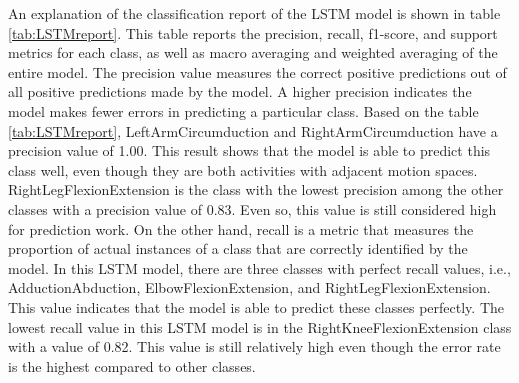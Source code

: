 An explanation of the classification report of the LSTM model is shown in table \ref{tab:LSTMreport}. This table reports the precision, recall, f1-score, and support metrics for each class, as well as macro averaging and weighted averaging of the entire model. The precision value measures the correct positive predictions out of all positive predictions made by the model. A higher precision indicates the model makes fewer errors in predicting a particular class. Based on the table \ref{tab:LSTMreport}, LeftArmCircumduction and RightArmCircumduction have a precision value of 1.00. This result shows that the model is able to predict this class well, even though they are both activities with adjacent motion spaces. RightLegFlexionExtension is the class with the lowest precision among the other classes with a precision value of 0.83. Even so, this value is still considered high for prediction work. On the other hand, recall is a metric that measures the proportion of actual instances of a class that are correctly identified by the model. In this LSTM model, there are three classes with perfect recall values, i.e., AdductionAbduction, ElbowFlexionExtension, and RightLegFlexionExtension. This value indicates that the model is able to predict these classes perfectly. The lowest recall value in this LSTM model is in the RightKneeFlexionExtension class with a value of 0.82. This value is still relatively high even though the error rate is the highest compared to other classes.

